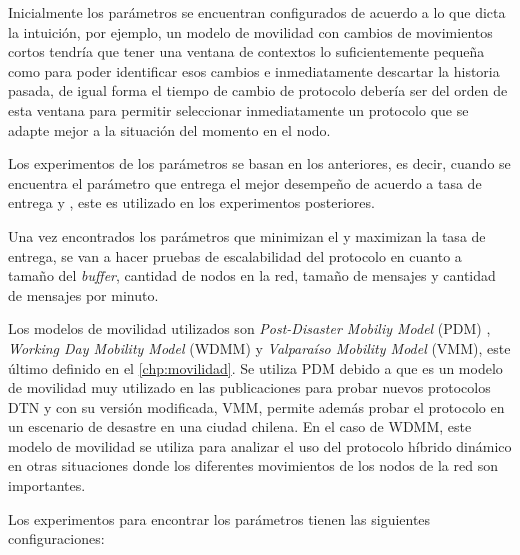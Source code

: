 Inicialmente los parámetros se encuentran configurados de acuerdo a lo que dicta
la intuición, por ejemplo, un modelo de movilidad con cambios de movimientos
cortos tendría que tener una ventana de contextos lo suficientemente pequeña
como para poder identificar esos cambios e inmediatamente descartar la historia
pasada, de igual forma el tiempo de cambio de protocolo debería ser del orden de
esta ventana para permitir seleccionar inmediatamente un protocolo que se adapte
mejor a la situación del momento en el nodo.

Los experimentos de los parámetros se basan en los anteriores, es decir, cuando
se encuentra el parámetro que entrega el mejor desempeño de acuerdo a tasa de
entrega y \overhead, este es utilizado en los experimentos posteriores.

Una vez encontrados los parámetros que minimizan el \overhead{} y maximizan la
tasa de entrega, se van a hacer pruebas de escalabilidad del protocolo en cuanto
a tamaño del \textit{buffer}, cantidad de nodos en la red, tamaño de mensajes
y cantidad de mensajes por minuto.

Los modelos de movilidad utilizados son \textit{Post-Disaster Mobiliy Model}
(PDM) \cite{uddin_post-disaster_2009}, \textit{Working Day Mobility Model}
(WDMM) \cite{ekman_working_2008} y  \textit{Valparaíso Mobility Model} (VMM),
este último definido en el \ref{chp:movilidad}. Se utiliza PDM debido a que es
un modelo de movilidad muy utilizado en las publicaciones para probar nuevos
protocolos DTN y con su versión modificada, VMM, permite además probar el
protocolo en un escenario de desastre en una ciudad chilena. En el caso de WDMM,
este modelo de movilidad se utiliza para analizar el uso del protocolo híbrido
dinámico en otras situaciones donde los diferentes movimientos de los nodos de
la red son importantes.



Los experimentos para encontrar los parámetros tienen las siguientes
configuraciones:

